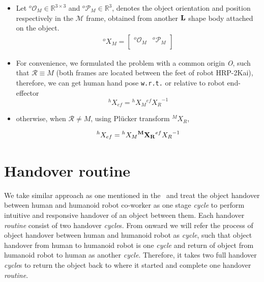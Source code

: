\begin{itemize}
	\item Let ${{}^{o}\mathcal{O}_M} \in \mathbb{R}^{3\times3}$ and ${{}^{o}\mathcal{P}_M} \in \mathbb{R}^{3}$, denotes the object orientation and position respectively in the $\mathcal{M}$ frame, obtained from another ${\bf L}$ shape body attached on the object.
	\begin{gather}\label{X_M_o}
	{}^{o}{X}_M =
	\left[\begin{array}{cc}
	{}^{o}\mathcal{O}_M & {}^{o}\mathcal{P}_M \\
	\end{array}\right]
	\end{gather}
	
	\item For convenience, we formulated the problem with a common origin {\it O}, such that $\mathcal R \equiv M$ (both frames are located between the feet of robot HRP-2Kai), therefore, we can get human hand pose \texttt{w.r.t.} or relative to robot end-effector
	\begin{equation}\label{X_ef_h1}
	{}^{h}{X}_{ef} = {}^{h}{X}_{M}  {}^{ef}{X_{R}}^{-1}
	\end{equation}
	\item otherwise, when $\mathcal R \neq M$, using Pl\"ucker transform ${}^MX_R$,
	
	\begin{equation}\label{X_ef_h2}
	{}^{h}{X}_{ef} = {}^{h}{X}_{M}  {\bf{}^{M}{X}_R}  {}^{ef}{X_{R}}^{-1}
	\end{equation}
	
\end{itemize}

\clearpage

\section{Handover routine}\label{handover routine}

We take similar approach as one mentioned in the~\cite{medina2016human, nemlekarprompt} and treat the object handover between human and humanoid robot co-worker as one stage \textit{cycle} to perform intuitive and responsive handover of an object between them. Each handover \textit{routine} consist of two handover \textit{cycle}s. From onward we will refer the process of object handover between human and humanoid robot as \textit{cycle}, such that object handover from human to humanoid robot is one \textit{cycle} and return of object from humanoid robot to human as another \textit {cycle}. Therefore, it takes two full handover \textit{cycle}s to return the object back to where it started and complete one handover \textit{routine}.

